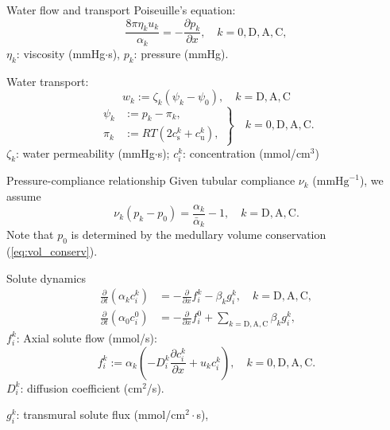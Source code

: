 \documentclass{beamer}
\begin{document}
\begin{frame}{Water flow and transport}
    Poiseuille's equation:
    \begin{equation}
        \frac{8\pi\eta_k u_k}{\alpha_k} = -\frac{\partial p_k}{\partial x},\quad k=0,\mathrm{D},\mathrm{A},\mathrm{C},
    \end{equation}
    $\eta_k$: viscosity (mmHg$\cdot$s), $p_k$: pressure (mmHg).
    \pause

    Water transport:
    \begin{equation}
        w_k := \zeta_k\left( \psi_k - \psi_0 \right),\quad  k=\mathrm{D},\mathrm{A},\mathrm{C}
    \end{equation}
    \begin{equation}
        \left. \begin{aligned}
            \psi_k&:=p_k - \pi_k,\\
            \pi_k&:= RT\left( 2c_\mathrm{s}^k+c_\mathrm{u}^k\right),
        \end{aligned} \right\}
        \quad k=0,\mathrm{D},\mathrm{A},\mathrm{C}.
    \end{equation}
    $\zeta_k$: water permeability (mmHg$\cdot$s); $c_i^k$: concentration (mmol/$\text{cm}^3$)
\end{frame}

\begin{frame}{Pressure-compliance relationship}
    Given tubular compliance $\nu_k$ ($\text{mmHg}^{-1}$), we assume
    \begin{equation}
        \nu_k(p_k - p_0) = \frac{\alpha_k}{\bar{\alpha}_k} - 1,\quad k=\mathrm{D},\mathrm{A},\mathrm{C}.
    \end{equation}
    Note that $p_0$ is determined by the medullary volume conservation (\ref{eq:vol_conserv}).
\end{frame}

\begin{frame}{Solute dynamics}
    \begin{align}\label{eq:solute_dynamics}
        \frac{\partial}{\partial t}\left( \alpha_k c_i^k \right)&=-\frac{\partial}{\partial x} f_i^k - \beta_kg_i^k,\quad k=\mathrm{D},\mathrm{A},\mathrm{C},\\
        \frac{\partial}{\partial t}\left( \alpha_0 c_i^0 \right)&=-\frac{\partial}{\partial x} f_i^0 + \sum_{k=\mathrm{D},\mathrm{A},\mathrm{C}} \beta_k g_i^k,
    \end{align}
    $f_i^k$: Axial solute flow (mmol/s):
    \begin{equation}
        f_i^k := \alpha_k\left( -D_i^k\frac{\partial c_i^k}{\partial x}+u_kc_i^k \right),\quad k=0,\mathrm{D},\mathrm{A},\mathrm{C}.
    \end{equation}
    $D_i^k$: diffusion coefficient ($\text{cm}^2$/s).

    $g_i^k$: transmural solute flux (mmol/$\text{cm}^2\cdot$s),
\end{frame}
\end{document}
